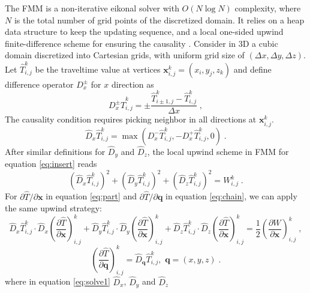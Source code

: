 The FMM is a non-iterative eikonal solver with $O(N \log N)$ complexity, 
where $N$ is the total number of grid points of the discretized domain. 
It relies on a heap data structure to keep the updating sequence, and 
a local one-sided upwind finite-difference scheme for ensuring the 
causality \cite[]{sethian1}. Consider in 3D a cubic domain discretized into Cartesian grids, 
with uniform grid size of $(\Delta x,\Delta y,\Delta z)$. Let $\hat{T}_{i,j}^k$ 
be the traveltime value at vertices $\mathbf{x}_{i,j}^k = (x_i,y_j,z_k)$ 
and define difference operator $D_x^{\pm}$ for $x$ direction as 
\begin{equation}
\label{eq:upwind1}
D_x^{\pm} \hat{T}_{i,j}^k = 
\pm \frac{\hat{T}_{i \pm 1,j}^k - \hat{T}_{i,j}^k}{\Delta x}\;,
\end{equation}
The causality condition requires picking  neighbor in all 
directions at $\mathbf{x}_{i,j}^k$. 
\begin{equation}
\label{eq:upwind2}
\hat{D}_x \hat{T}_{i,j}^k = 
\max \left( D_x^- \hat{T}_{i,j}^k, -D_x^+ \hat{T}_{i,j}^k, 0 \right)\;.
\end{equation}
After similar definitions for $\hat{D}_y$ and $\hat{D}_z$, the local 
upwind scheme in FMM for equation \ref{eq:insert} reads 
\begin{equation}
\label{eq:update}
\left( \hat{D}_x \hat{T}_{i,j}^k \right)^2 +
\left( \hat{D}_y \hat{T}_{i,j}^k \right)^2 +
\left( \hat{D}_z \hat{T}_{i,j}^k \right)^2 = W_{i,j}^k\;.
\end{equation}
For $\partial \hat{T} / \partial \mathbf{x}$ in equation \ref{eq:part} 
and $\partial \hat{T} / \partial \mathbf{q}$ in equation \ref{eq:chain}, 
we can apply the same upwind strategy: 
\begin{equation}
\label{eq:solve1}
\hat{D}_x \hat{T}_{i,j}^k \cdot 
\hat{D}_x \left( \frac{\partial \hat{T}}{\partial \mathbf{x}} \right)_{i,j}^k +
\hat{D}_y \hat{T}_{i,j}^k \cdot 
\hat{D}_y \left( \frac{\partial \hat{T}}{\partial \mathbf{x}} \right)_{i,j}^k +
\hat{D}_z \hat{T}_{i,j}^k \cdot 
\hat{D}_z \left( \frac{\partial \hat{T}}{\partial \mathbf{x}} \right)_{i,j}^k =
\frac{1}{2} \left( \frac{\partial W}{\partial \mathbf{x}} \right)_{i,j}^k\;,
\end{equation}
\begin{equation}
\label{eq:solve2}
\left( \frac{\partial \hat{T}}{\partial \mathbf{q}} \right)_{i,j}^k = 
\hat{D}_\mathbf{q} \hat{T}_{i,j}^k,\,\,\mathbf{q} = (x,y,z)\;.
\end{equation}
where in equation \ref{eq:solve1} $\hat{D}_x$, $\hat{D}_y$ and $\hat{D}_z$ 
